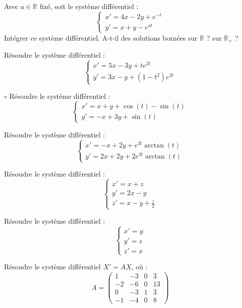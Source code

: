\documentclass[french,a4paper]{article}
\newcommand{\R}{\mathbb{R}}
\theoremstyle{plain}
\theoremstyle{definition}
\theoremstyle{remark}
\begin{document}
\begin{ex}[Moulin.21]{}
	Avec $a\in\R$ fixé, soit le système différentiel : $$\begin{cases}
		x'=4x-2y+e^{-t}\\
		y'=x+y-e^{at}
	\end{cases}$$ Intégrer ce système différentiel. A-t-il des solutions bornées sur $\R$ ? sur $\R_+$ ?
\end{ex}

\begin{ex}[Moulin.22]{}
	Résoudre le système différentiel :
	$$\begin{cases}
		x'=5x-3y+te^{2t}\\
		y'=3x-y+(1-t^2)e^{2t}
	\end{cases}$$
\end{ex}

\begin{ex}[Moulin.23]{$\circ$}
	Résoudre le système différentiel :
	$$\begin{cases}
		x'=x+y+\cos(t)-\sin(t)\\
		y'=-x+3y+\sin(t)
	\end{cases}$$
\end{ex}

\begin{ex}[Moulin.24]{}
	Résoudre le système différentiel :
	$$\begin{cases}
		x'=-x+2y+e^{3t}\arctan(t)\\
		y'=2x+2y+2e^{3t}\arctan(t)
	\end{cases}$$
\end{ex}

\begin{ex}[Moulin.25]{}
	Résoudre le système différentiel :
	$$\begin{cases}
		x'=x+z\\
		y'=2x-y\\
		z'=x-y+\displaystyle\frac{z}{2}
	\end{cases}$$
\end{ex}

\begin{ex}[Moulin.26]{}
	Résoudre le système différentiel :
	$$\begin{cases}
		x'=y\\
		y'=z\\
		z'=x
	\end{cases}$$
\end{ex}

\begin{ex}[Moulin.27]{}
	Résoudre le système différentiel $X'=AX$, où : $$A=\begin{pmatrix}
		1&-3&0&3\\
		-2&-6&0&13\\
		0&-3&1&3\\
		-1&-4&0&8
	\end{pmatrix}$$
\end{ex}
\end{document}
